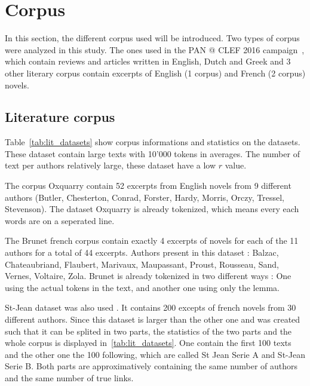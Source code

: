 \section{Corpus}

In this section, the different corpus used will be introduced.
Two types of corpus were analyzed in this study.
The ones used in the PAN @ CLEF 2016 campaign~\cite{pan16}, which contain reviews and articles written in English, Dutch and Greek and 3 other literary corpus contain excerpts of English (1 corpus) and French (2 corpus) novels.

\subsection{Literature corpus}
\label{sec:lit_corpus}

Table~\ref{tab:lit_datasets} show corpus informations and statistics on the datasets.
These dataset contain large texts with 10'000 tokens in averages.
The number of text per authors relatively large, these dataset have a low $r$ value.

The corpus Oxquarry contain 52 excerpts from English novels from 9 different authors (Butler, Chesterton, Conrad, Forster, Hardy, Morris, Orczy, Tressel, Stevenson).
The dataset Oxquarry is already tokenized, which means every each words are on a seperated line.

The Brunet french corpus contain exactly 4 excerpts of novels for each of the 11 authors for a total of 44 excerpts.
Authors present in this dataset : Balzac, Chateaubriand, Flaubert, Marivaux, Maupassant, Proust, Rousseau, Sand, Vernes, Voltaire, Zola.
Brunet is already tokenized in two different ways : One using the actual tokens in the text, and another one using only the lemma.

St-Jean dataset was also used \cite{unine_corpus}.
It contains 200 excepts of french novels from 30 different authors.
Since this dataset is larger than the other one and was created such that it can be splited in two parts, the statistics of the two parts and the whole corpus is displayed in~\ref{tab:lit_datasets}.
One contain the first 100 texts and the other one the 100 following, which are called St Jean Serie A and St-Jean Serie B.
Both parts are approximatively containing the same number of authors and the same number of true links.

